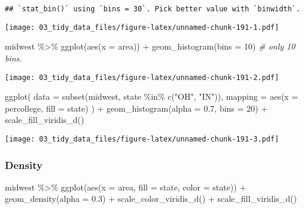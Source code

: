 \documentclass[
]{book}
\newenvironment{Shaded}{\begin{snugshade}}{\end{snugshade}}
\newcommand{\AttributeTok}[1]{\textcolor[rgb]{0.77,0.63,0.00}{#1}}
\newcommand{\CommentTok}[1]{\textcolor[rgb]{0.56,0.35,0.01}{\textit{#1}}}
\newcommand{\DecValTok}[1]{\textcolor[rgb]{0.00,0.00,0.81}{#1}}
\newcommand{\FloatTok}[1]{\textcolor[rgb]{0.00,0.00,0.81}{#1}}
\newcommand{\FunctionTok}[1]{\textcolor[rgb]{0.00,0.00,0.00}{#1}}
\newcommand{\NormalTok}[1]{#1}
\newcommand{\SpecialCharTok}[1]{\textcolor[rgb]{0.00,0.00,0.00}{#1}}
\newcommand{\StringTok}[1]{\textcolor[rgb]{0.31,0.60,0.02}{#1}}
\begin{document}
\begin{verbatim}
## `stat_bin()` using `bins = 30`. Pick better value with `binwidth`.
\end{verbatim}

\texttt{[image: 03\_tidy\_data\_files/figure-latex/unnamed-chunk-191-1.pdf]}

\begin{Shaded}
\begin{Highlighting}[]
\NormalTok{midwest }\SpecialCharTok{\%\textgreater{}\%}
  \FunctionTok{ggplot}\NormalTok{(}\FunctionTok{aes}\NormalTok{(}\AttributeTok{x =}\NormalTok{ area)) }\SpecialCharTok{+}
  \FunctionTok{geom\_histogram}\NormalTok{(}\AttributeTok{bins =} \DecValTok{10}\NormalTok{) }\CommentTok{\# only 10 bins.}
\end{Highlighting}
\end{Shaded}

\texttt{[image: 03\_tidy\_data\_files/figure-latex/unnamed-chunk-191-2.pdf]}

\begin{Shaded}
\begin{Highlighting}[]
\FunctionTok{ggplot}\NormalTok{(}
  \AttributeTok{data =} \FunctionTok{subset}\NormalTok{(midwest, state }\SpecialCharTok{\%in\%} \FunctionTok{c}\NormalTok{(}\StringTok{"OH"}\NormalTok{, }\StringTok{"IN"}\NormalTok{)),}
  \AttributeTok{mapping =} \FunctionTok{aes}\NormalTok{(}\AttributeTok{x =}\NormalTok{ percollege, }\AttributeTok{fill =}\NormalTok{ state)}
\NormalTok{) }\SpecialCharTok{+}
  \FunctionTok{geom\_histogram}\NormalTok{(}\AttributeTok{alpha =} \FloatTok{0.7}\NormalTok{, }\AttributeTok{bins =} \DecValTok{20}\NormalTok{) }\SpecialCharTok{+}
  \FunctionTok{scale\_fill\_viridis\_d}\NormalTok{()}
\end{Highlighting}
\end{Shaded}

\texttt{[image: 03\_tidy\_data\_files/figure-latex/unnamed-chunk-191-3.pdf]}

\hypertarget{density}{%
\subsubsection{Density}\label{density}}

\begin{Shaded}
\begin{Highlighting}[]
\NormalTok{midwest }\SpecialCharTok{\%\textgreater{}\%}
  \FunctionTok{ggplot}\NormalTok{(}\FunctionTok{aes}\NormalTok{(}\AttributeTok{x =}\NormalTok{ area, }\AttributeTok{fill =}\NormalTok{ state, }\AttributeTok{color =}\NormalTok{ state)) }\SpecialCharTok{+}
  \FunctionTok{geom\_density}\NormalTok{(}\AttributeTok{alpha =} \FloatTok{0.3}\NormalTok{) }\SpecialCharTok{+}
  \FunctionTok{scale\_color\_viridis\_d}\NormalTok{() }\SpecialCharTok{+}
  \FunctionTok{scale\_fill\_viridis\_d}\NormalTok{()}
\end{Highlighting}
\end{Shaded}
\end{document}
